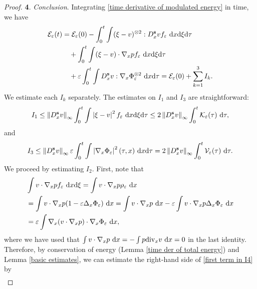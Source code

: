 \documentclass[11pt,reqno]{amsart}
\numberwithin{equation}{section}
\def\dd{{\rm d}}
\begin{document}
\begin{proof}
\smallskip 
\textbf{4}. \textit{Conclusion}. 
Integrating \eqref{time derivative of modulated energy} in time, we have
\begin{align*}
\mathcal{E}_{\varepsilon}(t)&=\mathcal{E}_{\varepsilon}(0)-\int_{0}^{t}\int (\xi-v)^{\otimes 2}:D^{\mathbf{s}}_{x}vf_{\varepsilon}\ \dd x\dd \xi\dd \tau\\
&\quad+\int_{0}^{t}\int (\xi-v)\cdot\nabla_{x} pf_{\varepsilon}\ \dd x\dd \xi \dd \tau\\
&\quad+\varepsilon\int_{0}^{t}\int D^{\mathbf{s}}_{x}v:\nabla_{x} \Phi_{\varepsilon}^{\otimes 2}\ \dd x \dd \tau=\mathcal{E}_{\varepsilon}(0)+\sum_{k=1}^{3}I_{k}.   
\end{align*}
 We estimate each $I_{k}$ separately. The estimates on $I_{1}$ and $I_{3}$ are straightforward:
\begin{align}
 I_{1}\leq \left\Vert D^{\mathbf{s}}_{x}v\right\Vert_{\infty}
\int_{0}^{t}\int\left\vert \xi-v\right\vert^{2}f_{\varepsilon}\ \dd x\dd \xi \dd \tau \leq 2\left\Vert D^{\mathbf{s}}_{x}v\right\Vert_{\infty} \int_{0}^{t}\mathcal{K}_{\varepsilon}(\tau)\ \dd \tau, \label{I1}     
\end{align}
and 
\begin{align}
I_{3}\leq \left\Vert D^{\mathbf{s}}_{x}v\right\Vert_{\infty} \varepsilon\int_{0}^{t}\int \left\vert \nabla_{x}\Phi_{\varepsilon}\right\vert^{2}(\tau,x)\ \dd x \dd \tau=2\left\Vert D^{\mathbf{s}}_{x}v\right\Vert_{\infty}\int_{0}^{t}\mathcal{V}_{\varepsilon}(\tau) \ \dd \tau.  \label{I3}     
\end{align}
We proceed by estimating $I_{2}$. First, note that 
\begin{align}
&\int v\cdot \nabla_{x} pf_{\varepsilon}\ \dd x\dd \xi=\int v\cdot \nabla_{x} p\rho_{\varepsilon}\ \dd x \notag\\
&=\int v\cdot \nabla_{x} p(1-\varepsilon\Delta_{x} \Phi_{\varepsilon})\ \dd x=\int v\cdot \nabla_{x}p\ \dd x-\varepsilon\int v\cdot \nabla_{x}p\Delta_{x} \Phi_{\varepsilon}\ \dd x \notag\\
&=\varepsilon\int \nabla_{x} (v\cdot \nabla_{x} p)\cdot \nabla_{x} \Phi_{\varepsilon}\ \dd x, \label{first term in I4} 
\end{align}
where we have used that $\int v\cdot \nabla_{x}p\ \dd x=-\int p\mathrm{div}_{x} v\ \dd x=0$ in the last identity.   
Therefore, by conservation of 
energy (Lemma \ref{time der of total energy}) and Lemma \ref{basic estimates},  
we can estimate the right-hand side of \eqref{first term in I4} by  
\begin{align}

\end{align}
\end{proof}
\end{document}
